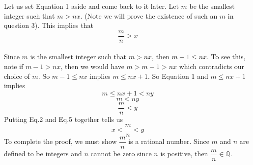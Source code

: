 \documentclass[12pt]{article}
\begin{document}
\begin{enumerate}
Let us set Equation 1 aside and come back to it later. Let $m$ be the smallest integer such that $m>nx$. (Note we will prove the existence of such an $m$ in question 3). This implies that \begin{equation}
\dfrac{m}{n} > x
\end{equation} \\
Since $m$ is the smallest integer such that $m>nx$, then $m-1 \leq nx$. To see this, note if $m-1 > nx$, then we would have $m> m-1 > nx$ which contradicts our choice of $m$. So $m-1 \leq nx$ implies $m \leq nx+1$. So Equation 1 and $m \leq nx+1$ implies
\begin{equation}
m \leq nx+1 < ny 
\end{equation}
\begin{equation}
m < ny 
\end{equation}
\begin{equation}
\dfrac{m}{n} < y
\end{equation}
Putting Eq.2 and Eq.5 together tells us
\begin{equation}
x < \dfrac{m}{n} < y 
\end{equation}
To complete the proof, we must show $\dfrac{m}{n}$ is a rational number. Since $m$ and $n$ are defined to be integers and $n$ cannot be zero since $n$ is positive, then $\dfrac{m}{n} \in \mathbb{Q}$.

\end{enumerate}
\end{document}
